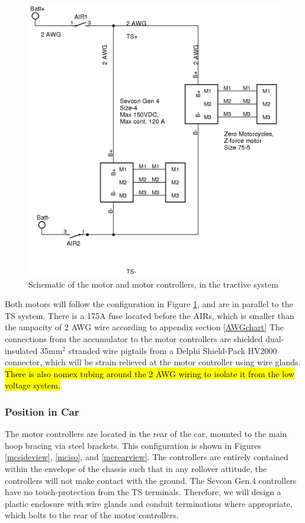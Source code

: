 \documentclass{article}
\DeclareRobustCommand{\hlr}[1]{{\sethlcolor{red}\hl{#1}}}
\begin{document}
            \begin{figure}[H]
                \centering
                \includegraphics[width = 0.75 \textwidth]{motorcontroller}
                \caption{Schematic of the motor and motor controllers, in the tractive system}
                \label{mcschem}
            \end{figure}


            Both motors will follow the configuration in Figure \ref{mcschem}, and are in parallel to the TS system. There is a 175A fuse located before the AIRs, which is smaller than the ampacity of 2 AWG wire according to appendix section \ref{AWGchart} The connections from the accumulator to the motor controllers are shielded dual-insulated 35mm$^2$ stranded wire pigtails from a Delphi Shield-Pack HV2000 connector, which will be strain relieved at the motor controller using wire glands. \hlr{There is also nomex tubing around the 2 AWG wiring to isolate it from the low voltage system. }

        \subsubsection{Position in Car}

            The motor controllers are located in the rear of the car, mounted to the main hoop bracing via steel brackets. This configuration is shown in Figures \ref{mcsideview}, \ref{mciso}, and \ref{mcrearview}. The controllers are entirely contained within the envelope of the chassis such that in any rollover attitude, the controllers will not make contact with the ground. The Sevcon Gen.4 controllers have no touch-protection from the TS terminals. Therefore, we will design a plastic enclosure with wire glands and conduit terminations where appropriate, which bolts to the rear of the motor controllers.
\end{document}
